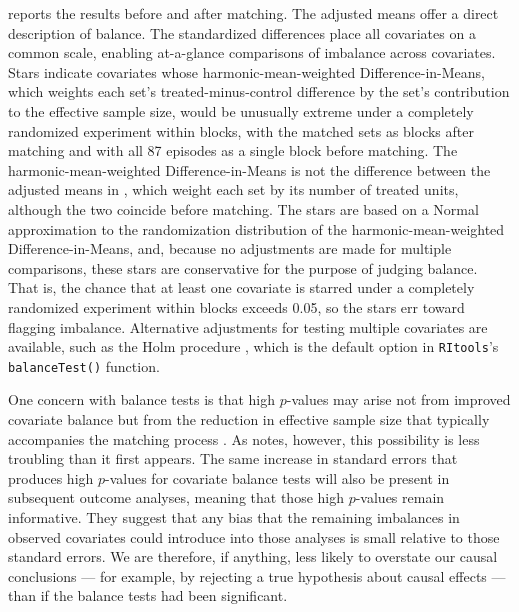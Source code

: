 \documentclass[
  12pt,
  leqno]{article}
\begin{document}
 reports the results before and after matching. The
adjusted means offer a direct description of balance. The standardized
differences place all covariates on a common scale, enabling at-a-glance
comparisons of imbalance across covariates. Stars indicate covariates
whose harmonic-mean-weighted Difference-in-Means, which weights each
set's treated-minus-control difference by the set's contribution to the
effective sample size, would be unusually extreme under a completely
randomized experiment within blocks, with the matched sets as blocks
after matching and with all 87 episodes as a single block before
matching. The harmonic-mean-weighted Difference-in-Means is not the
difference between the adjusted means in , which
weight each set by its number of treated units, although the two
coincide before matching. The stars are based on a Normal approximation
to the randomization distribution of the harmonic-mean-weighted
Difference-in-Means, and, because no adjustments are made for multiple
comparisons, these stars are conservative for the purpose of judging
balance. That is, the chance that at least one covariate is starred
under a completely randomized experiment within blocks exceeds 0.05, so
the stars err toward flagging imbalance. Alternative adjustments for
testing multiple covariates are available, such as the Holm procedure
\citep{holm1979}, which is the default option in \texttt{RItools}'s
\texttt{balanceTest()} function.

One concern with balance tests is that high \(p\)-values may arise not
from improved covariate balance but from the reduction in effective
sample size that typically accompanies the matching process
\citep{austin2008, imaietal2008}. As \citet{hansen2008b} notes, however,
this possibility is less troubling than it first appears. The same
increase in standard errors that produces high \(p\)-values for
covariate balance tests will also be present in subsequent outcome
analyses, meaning that those high \(p\)-values remain informative. They
suggest that any bias that the remaining imbalances in observed
covariates could introduce into those analyses is small relative to
those standard errors. We are therefore, if anything, less likely to
overstate our causal conclusions --- for example, by rejecting a true
hypothesis about causal effects --- than if the balance tests had been
significant.
\end{document}

